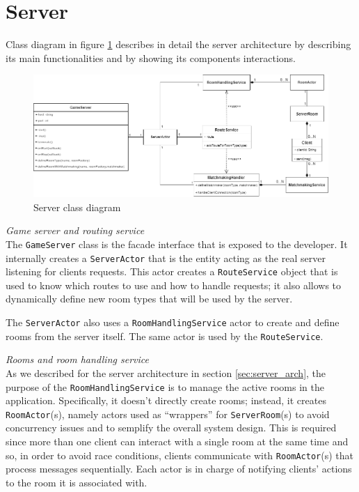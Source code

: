 \section{Server}
Class diagram in figure \ref{fig:server_class_diagram} describes in detail the server architecture by describing its main functionalities and by showing its components interactions.
\begin{figure}[h]
	\hspace*{-1.1in}
	\includegraphics[scale=0.55]{images/4-design/server_class.png}
	\caption{Server class diagram}
	\label{fig:server_class_diagram}
\end{figure}

\textit{Game server and routing service}
\\
The \texttt{GameServer} class is the facade interface that is exposed to the developer. It internally creates a \texttt{ServerActor} that is the entity acting as the real server listening for clients requests. This actor creates a \texttt{RouteService} object that is used to know which routes to use and how to handle requests; it also allows to dynamically define new room types that will be used by the server.

The \texttt{ServerActor} also uses a \texttt{RoomHandlingService} actor to create and define rooms from the server itself. The same actor is used by the \texttt{RouteService}.

\bigskip
\textit{Rooms and room handling service}
\\
As we described for the server architecture in section \ref{sec:server_arch}, the purpose of the \texttt{RoomHandlingService} is to manage the active rooms in the application. Specifically, it doesn't directly create rooms; instead, it creates \texttt{RoomActor}(s), namely actors used as ``wrappers'' for \texttt{ServerRoom}(s) to avoid concurrency issues and to semplify the overall system design. This is required since more than one client can interact with a single room at the same time and so, in order to avoid race conditions, clients communicate with \texttt{RoomActor}(s) that process messages sequentially. Each actor is in charge of notifying clients' actions to the room it is associated with.

